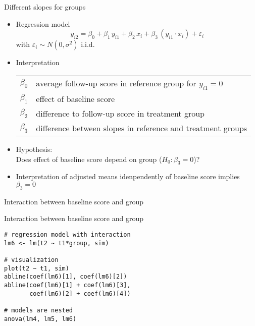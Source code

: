 \documentclass{beamer}
\begin{document}
\begin{frame}{Different slopes for groups}
\begin{itemize}
  \item Regression model
    \[
      y_{i2} = \beta_0 + \beta_1 \, y_{i1} + \beta_2 \, x_i +
               \beta_3 \, (y_{i1} \cdot x_i) + \varepsilon_i
    \]
    with $\varepsilon_i \sim N(0, \sigma^2)$ i.i.d.
  \item Interpretation
    \begin{tabular}{lp{10cm}}
    $\beta_0$ & average follow-up score in reference group for $y_{i1} = 0$\\
    $\beta_1$ & effect of baseline score\\
    $\beta_2$ & difference to follow-up score in treatment group\\
    $\beta_3$ & difference between slopes in reference and treatment groups
    \end{tabular}
  \item Hypothesis:\\
        Does effect of baseline score depend on group ($H_0\colon \beta_3 = 0$)?
  \item Interpretation of adjusted means idenpendently of baseline score
    implies $\beta_3 = 0$
\end{itemize}
\end{frame}


\begin{frame}{Interaction between baseline score and group}
\begin{center}
\end{center}
\end{frame}

{

\begin{frame}[fragile]{Interaction between baseline score and group}
\begin{lstlisting}
# regression model with interaction
lm6 <- lm(t2 ~ t1*group, sim)

# visualization
plot(t2 ~ t1, sim)
abline(coef(lm6)[1], coef(lm6)[2])
abline(coef(lm6)[1] + coef(lm6)[3], 
       coef(lm6)[2] + coef(lm6)[4])

# models are nested
anova(lm4, lm5, lm6)
\end{lstlisting}
\end{frame}

}
\end{document}
